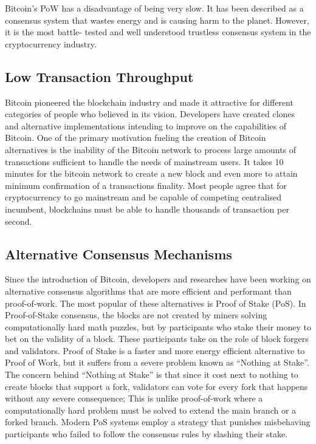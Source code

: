Bitcoin’s PoW has a disadvantage of being very slow. It has been described as a consensus system that wastes energy and is causing harm to the planet. However, it is the most battle- tested and well understood trustless consensus system in the cryptocurrency industry.

\subsection{Low Transaction Throughput}
Bitcoin pioneered the blockchain industry and made it attractive for different categories of people who believed in its vision. Developers have created clones and alternative implementations intending to improve on the capabilities of Bitcoin. One of the primary motivation fueling the creation of Bitcoin alternatives is the inability of the Bitcoin network to process large amounts of transactions sufficient to handle the needs of mainstream users. It takes 10 minutes for the bitcoin network to create a new block and even more to attain minimum confirmation of a transactions finality. Most people agree that for cryptocurrency to go mainstream and be capable of competing centralised incumbent, blockchains must be able to handle thousands of transaction per second.

\subsection{Alternative Consensus Mechanisms}
Since the introduction of Bitcoin, developers and researches have been working on alternative consensus algorithms that are more efficient and performant than proof-of-work. The most popular of these alternatives is Proof of Stake (PoS).
In Proof-of-Stake consensus, the blocks are not created by miners solving computationally hard math puzzles, but by participants who stake their money to bet on the validity of a block. These participants take on the role of block forgers and validators. Proof of Stake is a faster and more energy efficient alternative to Proof of Work, but it suffers from a severe problem known as “Nothing at Stake”. The concern behind “Nothing at Stake” is that since it cost next to nothing to create blocks that support a fork, validators can vote for every fork that happens without any severe consequence; This is unlike proof-of-work where a computationally hard problem must be solved to extend the main branch or a forked branch. Modern PoS systems employ a strategy that punishes misbehaving participants who failed to follow the consensus rules by slashing their stake.

